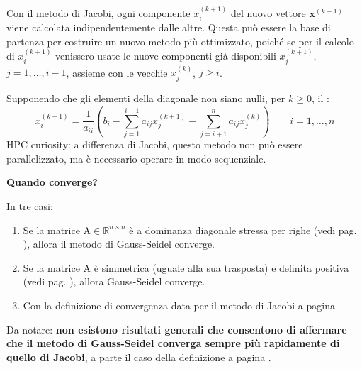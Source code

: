 Con il metodo di Jacobi, ogni componente $x_{i}^{\left(k+1\right)}$ del nuovo vettore $\mathbf{x}^{\left(k+1\right)}$ viene calcolata indipendentemente dalle altre. Questa può essere la base di partenza per costruire un nuovo metodo più ottimizzato, poiché se per il calcolo di $x_{i}^{\left(k+1\right)}$ venissero usate le nuove componenti già disponibili $x_{j}^{\left(k+1\right)}$, $j = 1, \dots, i-1$, assieme con le vecchie $x_{j}^{\left(k\right)}$, $j \ge i$.

\highspace
Supponendo che gli elementi della diagonale non siano nulli, per $k \ge 0$, il :
\begin{equation}\label{eq: metodo di Gauss-Seidel}
    x_{i}^{\left(k+1\right)} = 
    \dfrac{1}{a_{ii}} \left(
        b_{i} -
        \displaystyle\sum_{j=1}^{i-1} a_{ij}x_{j}^{\left(k+1\right)} -
        \displaystyle\sum_{j=i+1}^{n} a_{ij}x_{j}^{\left(k\right)}
    \right)
    \hspace{2em}
    i = 1, \dots, n
\end{equation}
HPC curiosity: a differenza di Jacobi, questo metodo non può essere parallelizzato, ma è necessario operare in modo sequenziale.

\begin{flushleft}
    \textcolor{Green3}{ \textbf{Quando converge?}}
\end{flushleft}
In tre casi:
\begin{enumerate}
    \item Se la matrice $\mathrm{A} \in \mathbb{R}^{n \times n}$ è a dominanza diagonale stressa per righe (vedi pag. \pageref{dominanza diagonale stressa per righe}), allora il metodo di Gauss-Seidel converge.

    \item Se la matrice $\mathrm{A}$ è simmetrica (uguale alla sua trasposta) e definita positiva (vedi pag. \pageref{matrice definita positiva}), allora Gauss-Seidel converge.

    \item Con la definizione di convergenza data per il metodo di Jacobi a pagina \pageref{definizione: convergenza di Jacobi e Gauss-Seidel}
\end{enumerate}
Da notare: \textbf{non esistono risultati generali che consentono di affermare che il metodo di Gauss-Seidel converga sempre più rapidamente di quello di Jacobi}, a parte il caso della definizione a pagina \pageref{matrice definita positiva}.

\newpage

